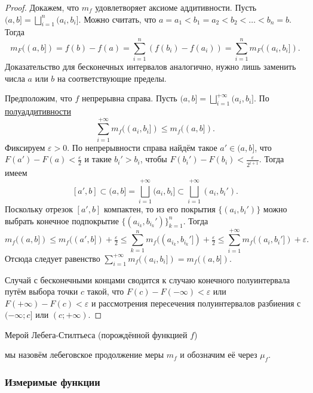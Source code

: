 \documentclass[12pt]{article}
\numberwithin{theorem}{section}
\theoremstyle{definition}
\newcommand{\defin}[2]{\hypertarget{#2}{{\color{red} #1}}}
\begin{document}
	\begin{proof}
		Докажем, что $ m_f $ удовлетворяет аксиоме аддитивности.
		Пусть $ (a, b] = \bigsqcup\limits_{i = 1}^{n} (a_i, b_i] $.
		Можно считать, что $ a = a_1 < b_1 = a_2 < b_2 < \ldots < b_n = b $.
		Тогда 
		$$ m_F((a,b]) = f(b) - f(a) = \sum\limits_{i = 1}^{n} (f(b_i) - f(a_i)) 
		= \sum\limits_{i = 1}^{n} m_F((a_i, b_i]). $$
		Доказательство для бесконечных интервалов аналогично, нужно лишь заменить числа $ a $ или $ b $
		на соответствующие пределы.
	
		Предположим, что $ f $ непрерывна справа.
		Пусть $ (a, b] = \bigsqcup\limits_{i = 1}^{+\infty} (a_i, b_i] $.
		По \hyperlink{semiadditivity}{полуаддитивности}
		$$ \sum\limits_{i = 1}^{+\infty} m_f((a_i, b_i]) \leqslant m_f((a, b]). $$
		Фиксируем $ \varepsilon > 0 $.
		По непрерывности справа найдём такое $ a' \in (a, b] $,
		что $ F(a') - F(a) < \tfrac{\varepsilon}{2} $
		и такие $ b_i' > b_i $, чтобы $ F(b_i') - F(b_i) < \tfrac{\varepsilon}{2^{i + 1}} $.
		Тогда имеем
		$$ [a',b] \subset (a,b] = \bigsqcup\limits_{i = 1}^{+\infty} (a_i, b_i] \subset \bigsqcup\limits_{i = 1}^{+\infty} (a_i, b_i'). $$
		Поскольку отрезок $ [a', b] $ компактен, то из его покрытия $ \{(a_i, b_i')\} $
		можно выбрать конечное подпокрытие $ \{(a_{i_k}, b_{i_k}')\}_{k = 1}^{n} $.
		Тогда $$ m_f((a,b]) \leqslant m_f((a',b]) + \tfrac{\varepsilon}{2} 
		\leqslant \sum\limits_{k = 1}^{n} m_f((a_{i_k}, b_{i_k}']) + \tfrac{\varepsilon}{2}
		\leqslant \sum\limits_{i = 1}^{+\infty} m_f((a_{i}, b_{i}']) + \varepsilon. $$
		Отсюда следует равенство $ \sum\limits_{i = 1}^{+\infty} m_f((a_i, b_i]) = m_f((a, b]) $.
		
		Случай с бесконечными концами сводится к случаю конечного полуинтервала
		путём выбора точки $ c $ такой, что $ F(c) - F(-\infty) < \varepsilon $
		или $ F(+\infty) - F(c) < \varepsilon $ и рассмотрения пересечения полуинтервалов разбиения с $ (-\infty; c] $
		или $ (c; +\infty) $.
	\end{proof}
	
	\defin{Мерой Лебега-Стилтьеса (порождённой функцией $ f $)}{Lebesgue-Stieltjes-measure} 
	мы назовём лебеговское продолжение меры $ m_f $ и обозначим её через $ \mu_f $.
	
	\subsubsection{Измеримые функции}
	
\end{document}
